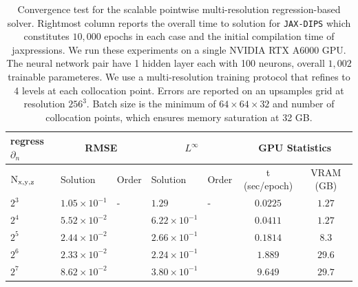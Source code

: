 \documentclass{elsarticle}
\begin{document}
\begin{table}[ht]
	\begin{center}
	\begin{tabular}{|l||ll|ll|c|c|}
	\hline
	regress $\partial_n$ & \multicolumn{2}{c|}{RMSE}& \multicolumn{2}{c|}{$L^\infty$} & \multicolumn{2}{c|}{GPU Statistics} \\
	\hline
	$\rm N_{x,y,z}$   &   Solution    &   Order   &   Solution   &   Order & t (sec/epoch) & VRAM (GB)\\
	\hline 
	$2^3$ & $ 1.05\times 10^{-1}$ &   -    & $ 1.29 $                &   -   & $ 0.0225 $  & $ 1.27 $ \\
	$2^4$ & $ 5.52\times 10^{-2}$ &  $ $   & $ 6.22\times 10^{-1} $  & $ $   & $ 0.0411 $  & $ 1.27 $ \\ 
	$2^5$ & $ 2.44\times 10^{-2}$ &  $ $   & $ 2.66\times 10^{-1}$   & $ $   & $ 0.1814 $  & $ 8.3  $ \\ 
	$2^6$ & $ 2.33\times 10^{-2}$ &  $ $   & $ 2.24\times 10^{-1} $   & $ $   & $ 1.889 $  & $ 29.6 $ \\ 
	$2^7$ & $ 8.62\times 10^{-2}$ &  $ $   & $ 3.80\times 10^{-1} $   & $ $   & $ 9.649 $  & $ 29.7 $ \\ \hline
	\end{tabular}
	\caption{Convergence test for the scalable pointwise multi-resolution regression-based solver. 
	Rightmost column reports the overall time to solution for \texttt{JAX-DIPS} which constitutes $10,000$ epochs in each case and the initial compilation time of jaxpressions. 
	We run these experiments on a single NVIDIA RTX A6000 GPU. The neural network pair have 1 hidden layer each with 100 neurons, overall $1,002$ trainable parameteres. 
	We use a multi-resolution training protocol that refines to 4 levels at each collocation point. 
	Errors are reported on an upsamples grid at resolution $256^3$. 
	Batch size is the minimum of $64\times 64\times 32$ and number of collocation points, which ensures memory saturation at 32 GB.}
	\end{center}
\end{table}
	
\end{document}
